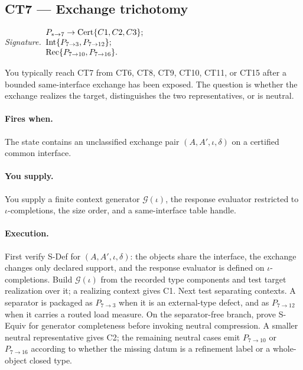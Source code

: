 \documentclass[
  11pt,
]{article}
\theoremstyle{definition}
\newcommand{\ctsignature}[1]{\par\noindent\emph{Signature.}\ #1\par\medskip}
\newcommand{\ctcert}[1]{\mathrm{Cert}\{#1\}}
\newcommand{\ctint}[1]{\mathrm{Int}\{#1\}}
\newcommand{\ctrec}[1]{\mathrm{Rec}\{#1\}}
\newcommand{\ctpar}[1]{\paragraph{#1.}}
\begin{document}
\subsection{CT7 --- Exchange trichotomy}\label{ct:7}\label{the-exchange-trichotomy}
\ctsignature{\(\begin{array}{@{}l@{}}
P_{\ast\to7}\to \ctcert{C1,C2,C3};\\
\ctint{P_{7\to3},P_{7\to12}};\\
\ctrec{P_{7\to10},P_{7\to16}}.
\end{array}\)}

You typically reach CT7 from CT6, CT8, CT9, CT10, CT11, or CT15 after a
bounded same-interface exchange has been exposed.  The question is
whether the exchange realizes the target, distinguishes the two
representatives, or is neutral.

\ctpar{Fires when}
The state contains an unclassified exchange pair
\((A,A',\iota,\delta)\) on a certified common interface.

\ctpar{You supply}
You supply a finite context generator \(\mathcal G(\iota)\), the
response evaluator restricted to \(\iota\)-completions, the size order,
and a same-interface table handle.

\ctpar{Execution}
First verify S-Def for \((A,A',\iota,\delta)\): the objects share the
interface, the exchange changes only declared support, and the response
evaluator is defined on \(\iota\)-completions.  Build
\(\mathcal G(\iota)\) from the recorded type components and test target
realization over it; a realizing context gives C1.  Next test separating
contexts.  A separator is packaged as \(P_{7\to3}\) when it is an
external-type defect, and as \(P_{7\to12}\) when it carries a routed
load measure.  On the separator-free branch, prove S-Equiv for generator
completeness before invoking neutral compression.  A smaller neutral
representative gives C2; the remaining neutral cases emit
\(P_{7\to10}\) or \(P_{7\to16}\) according to whether the missing datum
is a refinement label or a whole-object closed type.
\end{document}
